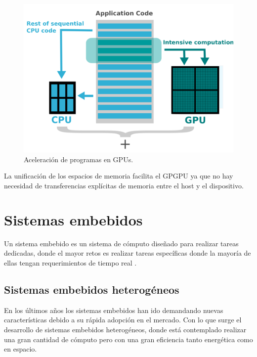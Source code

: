     \begin{figure}[ht]
      \centering
        \includegraphics[scale=0.9]{img/gpgpu}
        \caption{Aceleración de programas en GPUs\cite{gpgpu}.}
        \label{fig:gpgpu}
    \end{figure}

    La unificación de los espacios de memoria facilita el GPGPU ya que no hay necesidad de transferencias explícitas de memoria entre el host y el dispositivo.


    \section{Sistemas embebidos}

    Un sistema embebido es un sistema de cómputo diseñado para realizar tareas dedicadas, donde el mayor retos es realizar tareas específicas donde la mayoría de ellas tengan requerimientos de tiempo real \cite{LimPree}.

    \subsection{Sistemas embebidos heterogéneos}
    \vspace{0.3cm}
    En los últimos años los sistemas embebidos han ido demandando nuevas características debido a su rápida adopción en el mercado. Con lo que surge el desarrollo de sistemas embebidos heterogéneos, donde está contemplado realizar una gran cantidad de cómputo pero con una gran eficiencia tanto energética como en espacio.
    \vspace{0.3cm}

